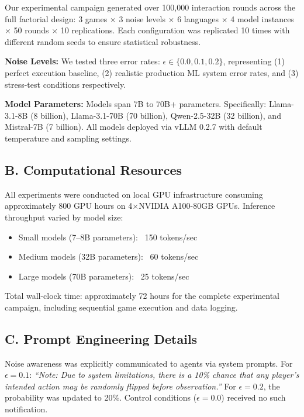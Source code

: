 \documentclass{uai2026} %
\begin{document}
Our experimental campaign generated over 100,000 interaction rounds across the full factorial design: 3 games $\times$ 3 noise levels $\times$ 6 languages $\times$ 4 model instances $\times$ 50 rounds $\times$ 10 replications. Each configuration was replicated 10 times with different random seeds to ensure statistical robustness.

\textbf{Noise Levels:} We tested three error rates: $\epsilon \in \{0.0, 0.1, 0.2\}$, representing (1) perfect execution baseline, (2) realistic production ML system error rates, and (3) stress-test conditions respectively.

\textbf{Model Parameters:} Models span 7B to 70B+ parameters. Specifically: Llama-3.1-8B (8 billion), Llama-3.1-70B (70 billion), Qwen-2.5-32B (32 billion), and Mistral-7B (7 billion). All models deployed via vLLM 0.2.7 with default temperature and sampling settings.

\subsection*{B. Computational Resources}

All experiments were conducted on local GPU infrastructure consuming approximately 800 GPU hours on 4$\times$NVIDIA A100-80GB GPUs. Inference throughput varied by model size:
\begin{itemize}
\item Small models (7--8B parameters): ~150 tokens/sec
\item Medium models (32B parameters): ~60 tokens/sec  
\item Large models (70B parameters): ~25 tokens/sec
\end{itemize}

Total wall-clock time: approximately 72 hours for the complete experimental campaign, including sequential game execution and data logging.

\subsection*{C. Prompt Engineering Details}

Noise awareness was explicitly communicated to agents via system prompts. For $\epsilon = 0.1$: \textit{``Note: Due to system limitations, there is a 10\% chance that any player's intended action may be randomly flipped before observation.''} For $\epsilon = 0.2$, the probability was updated to 20\%. Control conditions ($\epsilon = 0.0$) received no such notification.
\end{document}
